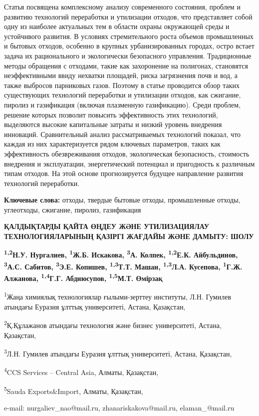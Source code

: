 Статья посвящена комплексному анализу современного состояния, проблем и
развитию технологий переработки и утилизации отходов, что представляет
собой одну из наиболее актуальных тем в области охраны окружающей среды
и устойчивого развития. В условиях стремительного роста объемов
промышленных и бытовых отходов, особенно в крупных урбанизированных
городах, остро встает задача их рационального и экологически безопасного
управления. Традиционные методы обращения с отходами, такие как
захоронение на полигонах, становятся неэффективными ввиду нехватки
площадей, риска загрязнения почв и вод, а также выбросов парниковых
газов. Поэтому в статье проводится обзор таких существующих технологий
переработки и утилизации отходов, как сжигание, пиролиз и газификация
(включая плазменную газификацию). Среди проблем, решение которых
позволит повысить эффективность этих технологий, выделяются высокие
капитальные затраты и низкий уровень внедрения инноваций. Сравнительный
анализ рассматриваемых технологий показал, что каждая из них
характеризуется рядом ключевых параметров, таких как эффективность
обезвреживания отходов, экологическая безопасность, стоимость внедрения
и эксплуатации, энергетический потенциал и пригодность к различным типам
отходов. На этой основе прогнозируется будущее направление развития
технологий переработки.

{\bfseries Ключевые слова:} отходы, твердые бытовые отходы, промышленные
отходы, углеотходы, сжигание, пиролиз, газификация

\begin{articleheader}
{\bfseries ҚАЛДЫҚТАРДЫ ҚАЙТА ӨҢДЕУ ЖӘНЕ УТИЛИЗАЦИЯЛАУ ТЕХНОЛОГИЯЛАРЫНЫҢ ҚАЗІРГІ ЖАҒДАЙЫ ЖӘНЕ ДАМЫТУ: ШОЛУ}

{\bfseries
\textsuperscript{1,2}Н.У. Нургалиев\textsuperscript{\envelope },
\textsuperscript{1}Ж.Б. Искакова\textsuperscript{\envelope },
\textsuperscript{3}А. Колпек,
\textsuperscript{1,2}Е.К. Айбульдинов\textsuperscript{\envelope },
\textsuperscript{3}А.С. Сабитов,
\textsuperscript{3}Э.Е. Копишев,
\textsuperscript{1,3}Т.Т. Машан,
\textsuperscript{1,3}Л.А. Кусепова,
\textsuperscript{1}Г.Ж. Алжанова,
\textsuperscript{1,4}Г.Г. Абдиюсупов,
\textsuperscript{1,5}М.Т. Өмірзақ
}
\end{articleheader}

\begin{articleheader}
\textsuperscript{1}Жаңа химиялық технологиялар ғылыми-зерттеу институты, Л.Н. Гумилев атындағы Еуразия ұлттық университеті, Астана, Қазақстан,

\textsuperscript{2}Қ.Құлажанов атындағы технология және бизнес университеті, Астана, Қазақстан,

\textsuperscript{3}Л.Н. Гумилев атындағы Еуразия ұлттық университеті, Астана, Қазақстан,

\textsuperscript{4}CCS Services -- Central Asia, Алматы, Қазақстан,

\textsuperscript{5}Sauda Exports\&Import, Алматы, Қазақстан,

e-mail: nurgaliev\_nao@mail.ru, zhanariskakova@mail.ru, elaman\_@mail.ru
\end{articleheader}

